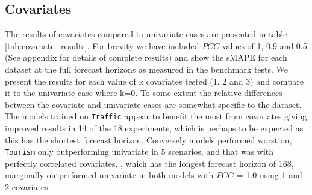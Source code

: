 \documentclass{article}
\newcommand{\pearson}{PCC}
\begin{document}
\subsection{Covariates}
The results of covariates compared to univariate cases are presented in table \ref{tab:covariate_results}. For brevity we have included $\pearson$ values of 1, 0.9 and 0.5 (See appendix for details of complete 
results) and show the sMAPE for each dataset at the full forecast horizons as measured in the benchmark tests. We present the results for each value of k covariates tested (1, 2 and 3) and 
compare it to the univariate case where k=0. To some extent the relative differences between the covariate and univariate cases are somewhat specific to the 
dataset. The models trained on \texttt{Traffic} appear to benefit the most from covariates giving improved results in 14 of the 18 experiments, which is perhaps to be expected 
as this has the shortest forecast horizon. Conversely models performed worst on, \texttt{Tourism} only outperforming univariate in 5 scenarios, and that was with perfectly correlated covariates.
, which has the longest forecast horizon of 168, marginally outperformed univariate in both models with $\pearson$ = 1.0 using 1 and 2 covariates. 
\end{document}
